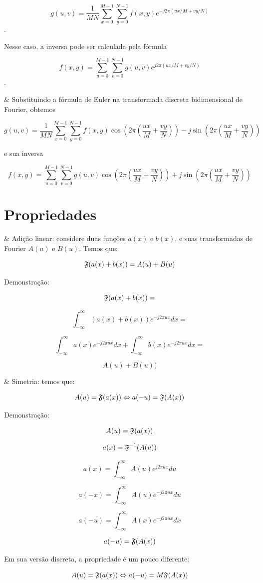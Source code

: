 \begin{easylist}
  \[ g(u, v) = \frac 1{MN} \sum^{M-1}_{x=0}\sum^{N-1}_{y=0} f(x, y) e^{-j2\pi (ux/M + vy/N)} \].

  Nesse caso, a inversa pode ser calculada pela fórmula

  \[ f(x, y) =             \sum^{M-1}_{u=0}\sum^{N-1}_{v=0} g(u, v) e^{ j2\pi (ux/M + vy/N)} \].

  
  & Substituindo a fórmula de Euler na transformada discreta bidimensional de Fourier, obtemos

  \[ g(u, v) = \frac 1{MN} \sum^{M-1}_{x=0}\sum^{N-1}_{y=0} f(x, y)
      \cos\left(2\pi \left(\frac{ux}{M} + \frac{vy}{N}\right)\right) -
     j\sin\left(2\pi \left(\frac{ux}{M} + \frac{vy}{N}\right)\right)   \]

  e sua inversa

  \[ f(x, y) =             \sum^{M-1}_{u=0}\sum^{N-1}_{v=0} g(u, v)
      \cos\left(2\pi \left(\frac{ux}{M} + \frac{vy}{N}\right)\right) +
     j\sin\left(2\pi \left(\frac{ux}{M} + \frac{vy}{N}\right)\right)   \]

\end{easylist}
  
\section{Propriedades}

\begin{easylist}

  & Adição linear: considere duas funções $a(x)$ e $b(x)$, e suas transformadas de Fourier $A(u)$ e $B(u)$. Temos que:

  \[ \mathfrak{F}(a(x) + b(x)) = A(u) + B(u) \]

  Demonstração:

  \[ \mathfrak{F}(a(x) + b(x)) = \]

  \[ \int^{\infty}_{-\infty} (a(x) + b(x)) e^{-j2\pi ux} dx = \]

  \[ \int^{\infty}_{-\infty} a(x) e^{-j2\pi ux} dx + \int^{\infty}_{-\infty} b(x) e^{-j2\pi ux} dx = \]

  \[ A(u) + B(u)) \]

  
  & Simetria: temos que:

  \[ A(u) = \mathfrak{F}(a(x)) \Leftrightarrow a(-u) = \mathfrak{F}(A(x)) \]

  Demonstração:

  \[ A(u) = \mathfrak{F}(a(x)) \]

  \[ a(x) = \mathfrak{F}^{-1}(A(u)) \]

  \[ a(x) = \int^{\infty}_{-\infty} A(u) e^{ j2\pi ux} du \]

  \[ a(-x) = \int^{\infty}_{-\infty} A(u) e^{ -j2\pi ux} du \]

  \[ a(-u) = \int^{\infty}_{-\infty} A(x) e^{ -j2\pi ux} dx \]

  \[ a(-u) = \mathfrak{F}(A(x)) \]
   
  Em sua versão discreta, a propriedade é um pouco diferente:  

  \[ A(u) = \mathfrak{F}(a(x)) \Leftrightarrow a(-u) = M \mathfrak{F}(A(x)) \]


\end{easylist}


